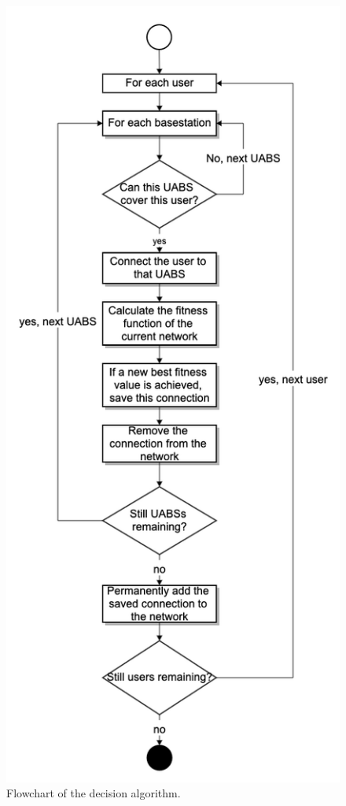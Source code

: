 \documentclass[twocolumn]{phdsymp_dutch}
\begin{document}
\begin{figure}[h!]
\centering
  \includegraphics[height=0.92\textheight]{decisionAlgoFlowChart.png}
  \caption{Flowchart of the decision algorithm.}
  \label{fig:decisionAlgoFlowChart}
\end{figure}
\end{document}
